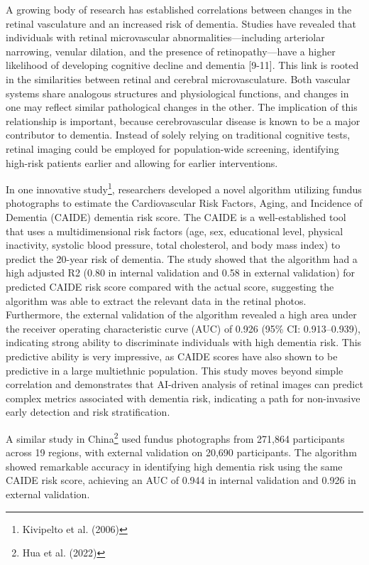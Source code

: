 \documentclass[
  Letterpaper,
]{scrbook}
\begin{document}
A growing body of research has established correlations between changes
in the retinal vasculature and an increased risk of dementia. Studies
have revealed that individuals with retinal microvascular
abnormalities---including arteriolar narrowing, venular dilation, and
the presence of retinopathy---have a higher likelihood of developing
cognitive decline and dementia {[}9-11{]}. This link is rooted in the
similarities between retinal and cerebral microvasculature. Both
vascular systems share analogous structures and physiological functions,
and changes in one may reflect similar pathological changes in the
other. The implication of this relationship is important, because
cerebrovascular disease is known to be a major contributor to dementia.
Instead of solely relying on traditional cognitive tests, retinal
imaging could be employed for population-wide screening, identifying
high-risk patients earlier and allowing for earlier interventions.

In one innovative study\footnote{Kivipelto et al. (2006)}, researchers
developed a novel algorithm utilizing fundus photographs to estimate the
Cardiovascular Risk Factors, Aging, and Incidence of Dementia (CAIDE)
dementia risk score. The CAIDE is a well-established tool that uses a
multidimensional risk factors (age, sex, educational level, physical
inactivity, systolic blood pressure, total cholesterol, and body mass
index) to predict the 20-year risk of dementia. The study showed that
the algorithm had a high adjusted R2 (0.80 in internal validation and
0.58 in external validation) for predicted CAIDE risk score compared
with the actual score, suggesting the algorithm was able to extract the
relevant data in the retinal photos. Furthermore, the external
validation of the algorithm revealed a high area under the receiver
operating characteristic curve (AUC) of 0.926 (95\% CI: 0.913--0.939),
indicating strong ability to discriminate individuals with high dementia
risk. This predictive ability is very impressive, as CAIDE scores have
also shown to be predictive in a large multiethnic population. This
study moves beyond simple correlation and demonstrates that AI-driven
analysis of retinal images can predict complex metrics associated with
dementia risk, indicating a path for non-invasive early detection and
risk stratification.

A similar study in China\footnote{Hua et al. (2022)} used fundus
photographs from 271,864 participants across 19 regions, with external
validation on 20,690 participants. The algorithm showed remarkable
accuracy in identifying high dementia risk using the same CAIDE risk
score, achieving an AUC of 0.944 in internal validation and 0.926 in
external validation.
\end{document}
